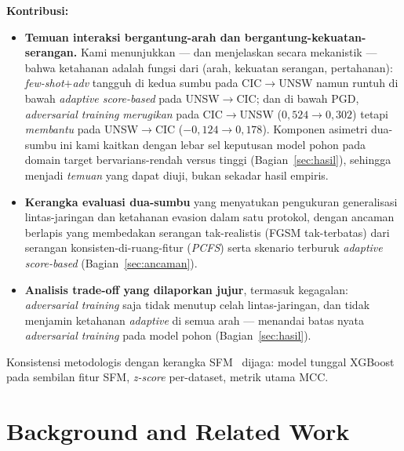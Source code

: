 \documentclass[11pt,a4paper]{article}
\begin{document}
\noindent\textbf{Kontribusi:}
\begin{itemize}
  \item \textbf{Temuan interaksi bergantung-arah dan bergantung-kekuatan-serangan.}
  Kami menunjukkan --- dan menjelaskan secara mekanistik --- bahwa ketahanan adalah
  fungsi dari (arah, kekuatan serangan, pertahanan): \emph{few-shot$+$adv} tangguh di
  kedua sumbu pada CIC$\rightarrow$UNSW namun runtuh di bawah \emph{adaptive
  score-based} pada UNSW$\rightarrow$CIC; dan di bawah PGD, \emph{adversarial
  training} \emph{merugikan} pada CIC$\rightarrow$UNSW ($0{,}524\rightarrow0{,}302$)
  tetapi \emph{membantu} pada UNSW$\rightarrow$CIC ($-0{,}124\rightarrow0{,}178$).
  Komponen asimetri dua-sumbu ini kami kaitkan dengan lebar sel keputusan model pohon
  pada domain target bervarians-rendah versus tinggi (Bagian~\ref{sec:hasil}),
  sehingga menjadi \emph{temuan} yang dapat diuji, bukan sekadar hasil empiris.
  \item \textbf{Kerangka evaluasi dua-sumbu} yang menyatukan pengukuran
  generalisasi lintas-jaringan dan ketahanan evasion dalam satu protokol, dengan
  ancaman berlapis yang membedakan serangan tak-realistis (FGSM tak-terbatas) dari
  serangan konsisten-di-ruang-fitur (\emph{PCFS}) serta skenario terburuk
  \emph{adaptive score-based} (Bagian~\ref{sec:ancaman}).
  \item \textbf{Analisis trade-off yang dilaporkan jujur}, termasuk kegagalan:
  \emph{adversarial training} saja tidak menutup celah lintas-jaringan, dan tidak
  menjamin ketahanan \emph{adaptive} di semua arah --- menandai batas nyata
  \emph{adversarial training} pada model pohon (Bagian~\ref{sec:hasil}).
\end{itemize}

\noindent Konsistensi metodologis dengan kerangka SFM~\cite{martono2024sfm} dijaga:
model tunggal XGBoost pada sembilan fitur SFM, \emph{z-score} per-dataset, metrik
utama MCC.

\section{Background and Related Work}
\label{sec:related}
\end{document}
